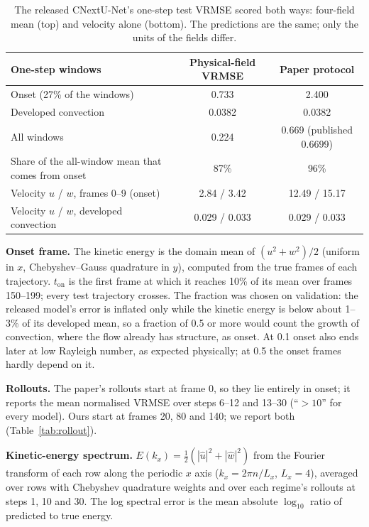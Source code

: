 \documentclass[11pt]{article}
\begin{document}
\begin{table}[tp]
\centering\small
\begin{tabular}{@{}lcc@{}}
\toprule
One-step windows & Physical-field VRMSE & Paper protocol \\
\midrule
Onset (27\% of the windows) & 0.733 & 2.400 \\
Developed convection & 0.0382 & 0.0382 \\
All windows & 0.224 & 0.669 (published 0.6699) \\
\midrule
Share of the all-window mean that comes from onset & 87\% & 96\% \\
\midrule
Velocity $u$ / $w$, frames 0--9 (onset) & 2.84 / 3.42 & 12.49 / 15.17 \\
Velocity $u$ / $w$, developed convection & 0.029 / 0.033 & 0.029 / 0.033 \\
\bottomrule
\end{tabular}
\caption{The released CNextU-Net's one-step test VRMSE scored both ways: four-field mean (top) and velocity alone
(bottom). The predictions are the same; only the units of the fields differ.}
\label{tab:units}
\end{table}

\textbf{Onset frame.} The kinetic energy is the domain mean of $(u^2+w^2)/2$ (uniform in $x$, Chebyshev--Gauss
quadrature in $y$), computed from the true frames of each trajectory. $t_{\mathrm{on}}$ is the first frame at which it
reaches 10\% of its mean over frames 150--199; every test trajectory crosses. The fraction was chosen on validation:
the released model's error is inflated only while the kinetic energy is below about 1--3\% of its developed mean, so a
fraction of 0.5 or more would count the growth of convection, where the flow already has structure, as onset. At 0.1
onset also ends later at low Rayleigh number, as expected physically; at 0.5 the onset frames hardly depend on it.

\textbf{Rollouts.} The paper's rollouts start at frame 0, so they lie entirely in onset; it reports the mean
normalised VRMSE over steps 6--12 and 13--30 (``$>10$'' for every model). Ours start at frames 20, 80 and 140; we
report both (Table~\ref{tab:rollout}).

\textbf{Kinetic-energy spectrum.} $E(k_x)=\tfrac12(|\hat u|^2+|\hat w|^2)$ from the Fourier transform of each row
along the periodic $x$ axis ($k_x=2\pi n/L_x$, $L_x=4$), averaged over rows with Chebyshev quadrature weights and
over each regime's rollouts at steps 1, 10 and 30. The log spectral error is the mean absolute $\log_{10}$ ratio of
predicted to true energy.
\end{document}
